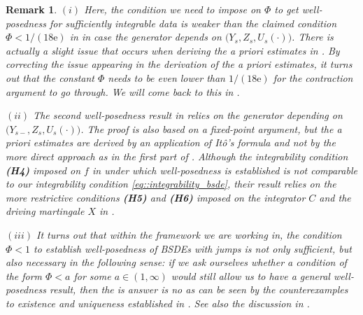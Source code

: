 \documentclass[10pt]{article} %
\newtheorem{remark}[theorem]{Remark}
\newcommand{\1}{\mathbf{1}}
\begin{document}
\begin{remark}\label{rem::main_bsde}
	$(i)$ Here, the condition we need to impose on $\Phi$ to get well-posedness for sufficiently integrable data is weaker than the claimed condition $\Phi < 1/(18\mathrm{e})$ in {\rm\cite[Corollary 3.6]{papapantoleon2018existence}} in case the generator depends on $\big(Y_s,Z_s,U_s(\cdot)\big)$. There is actually a slight issue that occurs when deriving the \emph{a priori} estimates in {\rm\cite{papapantoleon2018existence}}. By correcting the issue appearing in the derivation of the \emph{a priori} estimates, it turns out that the constant $\Phi$ needs to be even lower than $1/(18\mathrm{e})$ for the contraction argument to go through. We will come back to this in {\rm{}}.
	
	\medskip
	$(ii)$ The second well-posedness result in {\rm\cite[Theorem 3.23]{papapantoleon2018existence}} relies on the generator depending on $\big(Y_{s-},Z_s,U_s(\cdot)\big)$. The proof is also based on a fixed-point argument, but the \emph{a priori} estimates are derived by an application of It\^o's formula and not by the more direct approach as in the first part of {\rm \cite{papapantoleon2018existence}}. Although the integrability condition {\bf(H4)} imposed on $f$ in {\rm\cite{papapantoleon2018existence}} under which well-posedness is established is not comparable to our integrability condition \eqref{eq::integrability_bsde}, their result relies on the more restrictive conditions {\bf(H5)} and {\bf(H6)} imposed on the integrator $C$ and the driving martingale $X$ in {\rm\cite{papapantoleon2018existence}}. 
	
	\medskip
	$(iii)$ It turns out that within the framework we are working in, the condition $\Phi < 1$ to establish well-posedness of  \emph{BSDEs} with jumps is not only sufficient, but also necessary in the following sense: if we ask ourselves whether a condition of the form $\Phi < a$ for some $a \in (1,\infty)$ would still allow us to have a general well-posedness result, then the is answer is no as can be seen by the counterexamples to existence and uniqueness established in {\rm\citeauthor*{confortola2014backward} \cite[Section 4.3]{confortola2014backward}}. See also the discussion in {\rm\citeauthor*{papapantoleon2018existence} \cite[Section 3.3.1]{papapantoleon2018existence}}. 
	

\end{remark}
\end{document}
